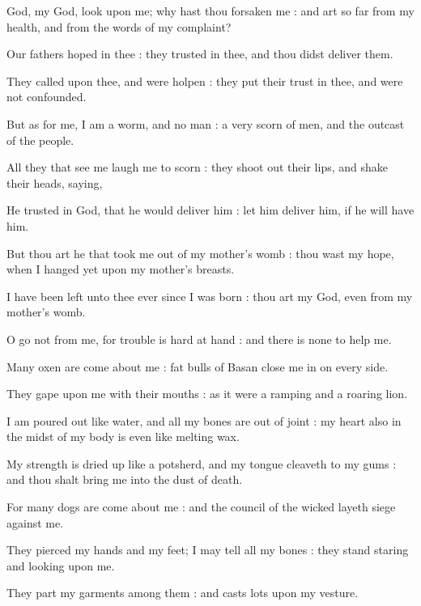  God, my God, look upon me; why hast thou forsaken me : and art so far from my health, and from the words of my complaint?\par
{}
Our fathers hoped in thee : they trusted in thee, and thou didst deliver them.\par
{}They called upon thee, and were holpen : they put their trust in thee, and were not confounded.\par
{}But as for me, I am a worm, and no man : a very scorn of men, and the outcast of the people.\par
{}All they that see me laugh me to scorn : they shoot out their lips, and shake their heads, saying,\par
{}He trusted in God, that he would deliver him : let him deliver him, if he will have him.\par
{}But thou art he that took me out of my mother's womb : thou wast my hope, when I hanged yet upon my mother's breasts.\par
{}I have been left unto thee ever since I was born : thou art my God, even from my mother's womb.\par
{}O go not from me, for trouble is hard at hand : and there is none to help me.\par
{}Many oxen are come about me : fat bulls of Basan close me in on every side.\par
{}They gape upon me with their mouths : as it were a ramping and a roaring lion.\par
{}I am poured out like water, and all my bones are out of joint : my heart also in the midst of my body is even like melting wax.\par
{}My strength is dried up like a potsherd, and my tongue cleaveth to my gums : and thou shalt bring me into the dust of death.\par
{}For many dogs are come about me : and the council of the wicked layeth siege against me.\par
{}They pierced my hands and my feet; I may tell all my bones : they stand staring and looking upon me.\par
{}They part my garments among them : and casts lots upon my vesture.\par
